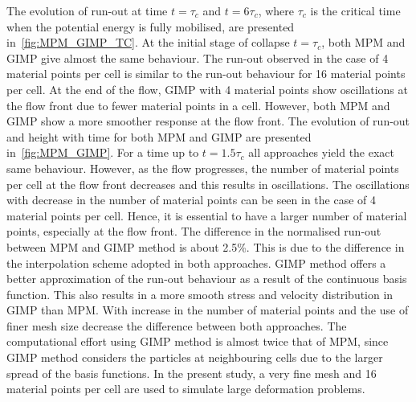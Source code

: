The evolution of run-out at time $t=\tau_c$ and $t=6\tau_c$, where $\tau_c$ is 
the critical time when the potential energy is fully mobilised, are presented 
in~\cref{fig:MPM_GIMP_TC}. At the initial stage of collapse $t=\tau_c$, both 
MPM and GIMP give almost the same behaviour. The run-out observed in the case 
of 4 material points per cell is similar to the run-out behaviour for 16 
material points per cell. At the end of the flow, GIMP with 4 material points 
show oscillations at the flow front due to fewer material points in a cell. 
However, both MPM and GIMP show a more smoother response at the flow front. The 
evolution of run-out and height with time for both MPM and GIMP are presented 
in~\cref{fig:MPM_GIMP}. For a time up to $t=1.5\tau_c$ all approaches yield the 
exact same behaviour. However, as the flow progresses, the number of material 
points per cell at the flow front decreases and this results in oscillations. 
The oscillations with decrease in the number of material points can be seen in 
the case of 4 material points per cell. Hence, it is essential to have a larger 
number of material points, especially at the flow front. The difference in the 
normalised run-out between MPM and GIMP method is about 2.5\%. This is due to 
the difference in the interpolation scheme adopted in both approaches. GIMP 
method offers a better approximation of the run-out behaviour as a result of 
the continuous basis function. This also results in a more smooth stress and 
velocity distribution in GIMP than MPM. With increase in the number of material 
points and the use of finer mesh size decrease the difference between both 
approaches. The computational effort using GIMP method is almost twice that of 
MPM, since GIMP method considers the particles at neighbouring cells due to the 
larger spread of the basis functions. In the present study, a very fine mesh 
and 16 material points per cell are used to simulate large deformation 
problems. 

